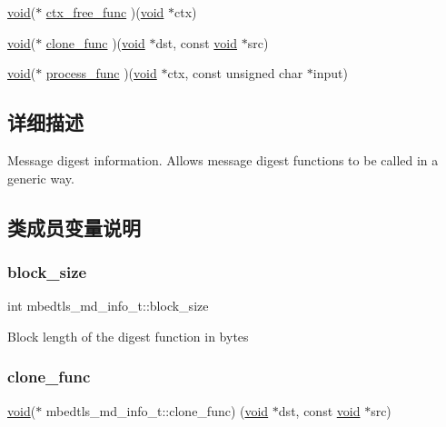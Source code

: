 \begin{DoxyCompactItemize}
\hyperlink{interfacevoid}{void}($\ast$ \hyperlink{structmbedtls__md__info__t_adc08407de7df014fc25e95cefb453073}{ctx\+\_\+free\+\_\+func} )(\hyperlink{interfacevoid}{void} $\ast$ctx)
\item 
\hyperlink{interfacevoid}{void}($\ast$ \hyperlink{structmbedtls__md__info__t_a8cba4e27132e91a692323e4503777543}{clone\+\_\+func} )(\hyperlink{interfacevoid}{void} $\ast$dst, const \hyperlink{interfacevoid}{void} $\ast$src)
\item 
\hyperlink{interfacevoid}{void}($\ast$ \hyperlink{structmbedtls__md__info__t_af5456d53add6cfe02fee1e3e4912ff05}{process\+\_\+func} )(\hyperlink{interfacevoid}{void} $\ast$ctx, const unsigned char $\ast$input)
\end{DoxyCompactItemize}


\subsection{详细描述}
Message digest information. Allows message digest functions to be called in a generic way. 

\subsection{类成员变量说明}
\mbox{\label{structmbedtls__md__info__t_a2090181c3aef5c7d692147340a6bdf99}} 
\subsubsection{\texorpdfstring{block\+\_\+size}{block\_size}}
{\footnotesize\ttfamily int mbedtls\+\_\+md\+\_\+info\+\_\+t\+::block\+\_\+size}

Block length of the digest function in bytes \mbox{\label{structmbedtls__md__info__t_a8cba4e27132e91a692323e4503777543}} 
\subsubsection{\texorpdfstring{clone\+\_\+func}{clone\_func}}
{\footnotesize\ttfamily \hyperlink{interfacevoid}{void}($\ast$ mbedtls\+\_\+md\+\_\+info\+\_\+t\+::clone\+\_\+func) (\hyperlink{interfacevoid}{void} $\ast$dst, const \hyperlink{interfacevoid}{void} $\ast$src)}

